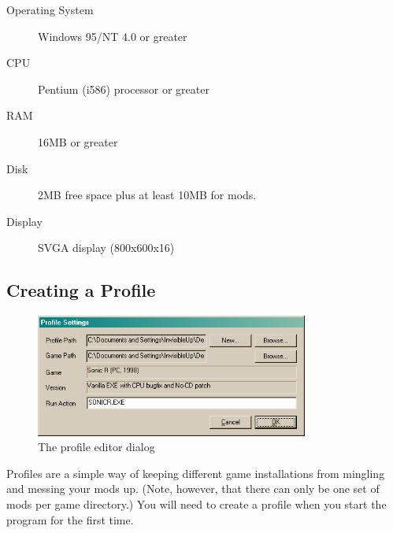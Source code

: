 \documentclass[12pt,a4paper,notitlepage]{article}
\begin{document}
\begin{description}
	\item[Operating System] Windows 95/NT 4.0 or greater
	\item[CPU] Pentium (i586) processor or greater
	\item[RAM] 16MB or greater
	\item[Disk] 2MB free space plus at least 10MB for mods.
	\item[Display] SVGA display (800x600x16)
\end{description}


\subsection{Creating a Profile}
\label{subsec:using-profile}

\begin{figure}[h]
	\centering
	\includegraphics[width=0.8\textwidth]{profile.png}
	\caption{The profile editor dialog}
	\label{fig:profile}
\end{figure}

Profiles are a simple way of keeping different game installations from mingling and messing your mods up. (Note, however, that there can only be one set of mods per game directory.)  You will need to create a profile when you start the program for the first time. 
\end{document}
